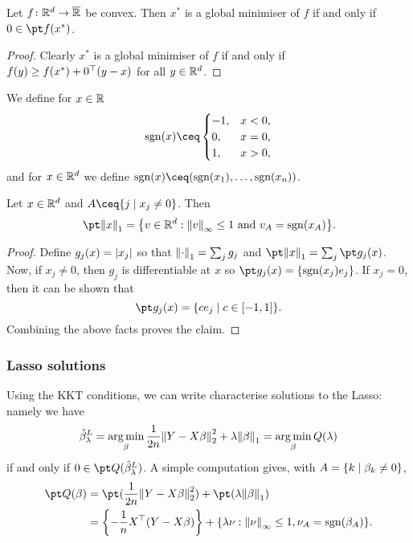 \begin{proposition}
	Let $f \colon \mathbb R^d \to \overline{\mathbb R}$ be convex. Then $x^*$ is a global minimiser of $f$ if and only if $0 \in \pt f(x^*)$. 
\end{proposition}

\begin{proof}
	Clearly $x^*$ is a global minimiser of $f$ if and only if $f(y) \geq f(x^*) + 0^\top (y - x)$ for all $y \in \mathbb R^d$. 
\end{proof}

We define for $x \in \mathbb R$
\[
\sign(x) \ceq\begin{cases}
	-1, &x<0,\\ 0, &x=0, \\ 1, &x>0,
\end{cases}
\]
and for $x \in \mathbb R^d$ we define $\sign(x) \ceq (\sign(x_1), \dotsc, \sign(x_n))$. 

\begin{proposition}
	Let $x \in \mathbb R^d$ and $A \ceq \qty{j \mid x_j \neq 0}$. Then
	\[
	\pt \norm{x}_1 = \qty{v \in \RR^d : \norm{v}_\infty \leq 1 \text{ and } v_A = \sign(x_A)}. 
	\]
\end{proposition}

\begin{proof}
	Define $g_j(x) = \abs{x_j}$ so that $\norm{\cdot}_1 = \sum_j g_j$ and $\pt \norm{x}_1 = \sum_j \pt g_j(x)$. Now, if $x_j \neq 0$, then $g_j$ is differentiable at $x$ so $\pt g_j(x) = \qty{\sign(x_j) e_j}$. If $x_j = 0$, then it can be shown that
	\[
	\pt g_j(x) = \qty{c e_j \mid c \in [-1, 1]}.
	\]
	Combining the above facts proves the claim. 
\end{proof}

\subsubsection{Lasso solutions}

Using the KKT conditions, we can write characterise solutions to the Lasso: namely we have
\[
\hat\beta_\lambda^L = \operatorname*{arg\,min}_\beta \frac1{2n} \norm{Y- X\beta}_2^2 + \lambda \norm{\beta}_1 = \operatorname*{arg\,min}_\beta Q(\lambda)
\]
if and only if $0 \in \pt Q(\hat \beta_\lambda^L)$. A simple computation gives, with $A = \qty{k \mid \beta_k \neq 0}$, 
\begin{align*}
\pt Q(\beta) &= \pt(\frac1{2n} \norm{Y- X\beta}_2^2) + \pt(\lambda \norm{\beta}_1) \\
&= \qty{-\frac1n X\T(Y - X\beta)} + \qty{\lambda \nu : \norm{\nu}_\infty \leq 1, \nu_A = \sign(\beta_A)}. 
\end{align*}

